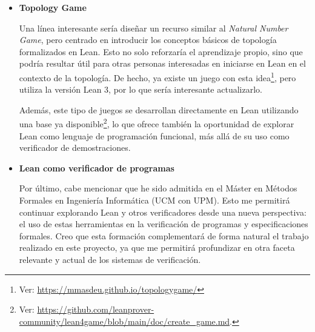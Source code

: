 \begin{itemize}
  \item \textbf{Topology Game}
  
  Una línea interesante sería diseñar un recurso similar al \textit{Natural Number Game}, pero centrado en introducir los conceptos básicos de topología formalizados en Lean. Esto no solo reforzaría el aprendizaje propio, sino que podría resultar útil para otras personas interesadas en iniciarse en Lean en el contexto de la topología. De hecho, ya existe un juego con esta idea\footnote{Ver: \url{https://mmasdeu.github.io/topologygame/}}, pero utiliza la versión Lean 3, por lo que sería interesante actualizarlo.
  
  Además, este tipo de juegos se desarrollan directamente en Lean utilizando una base ya disponible\footnote{Ver: \linebreak \url{https://github.com/leanprover-community/lean4game/blob/main/doc/create\_game.md}.}, lo que ofrece también la oportunidad de explorar Lean como lenguaje de programación funcional, más allá de su uso como verificador de demostraciones.

  \item \textbf{Lean como verificador de programas}
  
  Por último, cabe mencionar que he sido admitida en el Máster en Métodos Formales en Ingeniería Informática (UCM con UPM). Esto me permitirá continuar explorando Lean y otros verificadores desde una nueva perspectiva: el uso de estas herramientas en la verificación de programas y especificaciones formales. Creo que esta formación complementará de forma natural el trabajo realizado en este proyecto, ya que me permitirá profundizar en otra faceta relevante y actual de los sistemas de verificación.
\end{itemize}